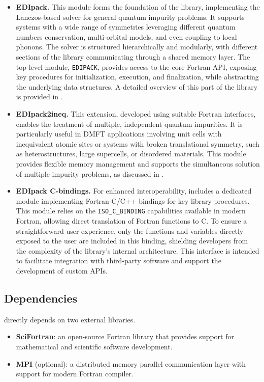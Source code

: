 \documentclass[edipack_sp.tex]{subfiles}
\begin{document}
\begin{itemize}
\item{\bf EDIpack.}
  This module forms the foundation of the library, implementing the 
  Lanczos-based solver for general quantum impurity problems. It 
  supports systems with a wide range of symmetries leveraging different quantum numbers conservation, multi-orbital models, and even coupling to local 
  phonons. The \NAME solver is structured hierarchically and modularly, 
  with different sections of the library communicating through a shared 
  memory layer. The top-level module, {\tt EDIPACK}, provides access 
  to the core Fortran API, exposing key procedures for initialization, 
  execution, and finalization, while abstracting the underlying data 
  structures. A detailed overview of this part of the library is 
  provided in .
  
\item{\bf EDIpack2ineq.}
  This extension, developed using suitable Fortran interfaces,
  enables the treatment of multiple, independent quantum 
impurities. It is particularly useful in DMFT applications involving 
unit cells with inequivalent atomic sites or systems with broken 
translational symmetry, such as heterostructures, large supercells, 
or disordered materials. This module provides flexible memory 
management and supports the simultaneous solution of multiple impurity 
problems, as discussed in .



\item{\bf EDIpack C-bindings.}
  For enhanced interoperability, \NAME includes a dedicated module 
implementing Fortran-C/C++ bindings for key library procedures. This 
module relies on the {\tt ISO\_C\_BINDING} capabilities available in 
modern Fortran, allowing direct translation of Fortran functions to C. 
To ensure a straightforward user experience, only the functions and 
variables directly exposed to the user are included in this binding, 
shielding developers from the complexity of the library's internal 
architecture. This interface is intended to facilitate integration 
with third-party software and support the development of custom APIs.
\end{itemize}




\subsection{Dependencies}\label{sSecInstallDependencies}
\NAME directly depends on two external libraries.
\begin{itemize}
\item {\bf SciFortran}: an open-source Fortran library that provides support
for mathematical and scientific software development.
\item {\bf MPI} (optional): a distributed memory parallel communication layer with support for modern Fortran compiler.
\end{itemize}
 
\end{document}
